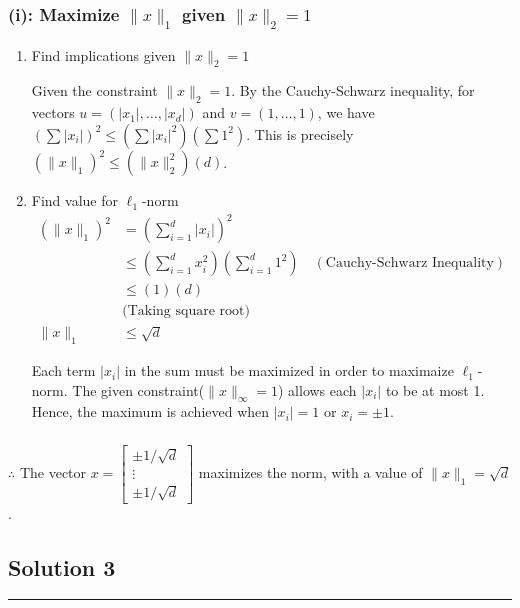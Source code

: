 \documentclass{article}
\begin{document}
\subsubsection*{(i): Maximize $\|x\|_1$ given $\|x\|_{2}=1$}
\begin{enumerate}
  \item Find implications given $\|x\|_{2}=1$

\begin{flushleft}
Given the constraint $\|x\|_{2} = 1$. By the Cauchy-Schwarz inequality, for vectors $u=(|x_1|, \dots, |x_d|)$ and $v=(1, \dots, 1)$, we have $(\sum |x_i|)^2 \le (\sum |x_i|^2)(\sum 1^2)$. This is precisely $(\|x\|_1)^2 \le (\|x\|_2^2)(d)$.
\end{flushleft}
  \item Find value for $\ell_1$-norm
\begin{align*}
    (\|x\|_1)^2 &= \left(\sum_{i=1}^d |x_i|\right)^2 \\
    &\le \left(\sum_{i=1}^d x_i^2\right) \left(\sum_{i=1}^d 1^2\right) \quad (\text{Cauchy-Schwarz Inequality}) \\
    &\le (1)(d) \\
    &\text{(Taking square root)} \\
    \|x\|_1 &\le \sqrt{d}
\end{align*}

\begin{flushleft}
Each term $|x_i|$ in the sum must be maximized in order to maximaize $\ell_1$-norm. The given constraint($\|x\|_{\infty}=1$) allows each $|x_i|$ to be at most 1. Hence, the maximum is achieved when $|x_i|=1$ or $x_i=\pm1$.
\end{flushleft}
\end{enumerate}

\subsubsection*{\normalfont}{$\therefore$ The vector $x = \begin{bmatrix} \pm 1/\sqrt{d} \\ \vdots \\ \pm 1/\sqrt{d} \end{bmatrix}$ maximizes the norm, with a value of $\|x\|_1 = \sqrt{d}$.}

\newpage
\subsection*{Solution 3}
\noindent\rule{\textwidth}{0.4pt}\\
\end{document}
